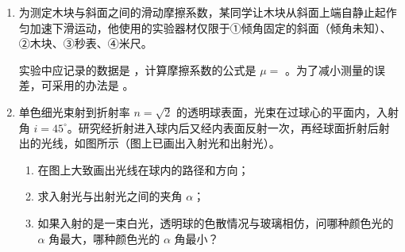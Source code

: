 \documentclass[\gkver]{gaokaozhenti}
\begin{document}
\begin{enumerate}
从纸带上可以确定小车作匀减速运动的初速度是  $\Ums$，小车在布上运动的加速度大小是  $\Umsq$。
\onepicture[align=right, w=12.00cm]{}


\item
为测定木块与斜面之间的滑动摩擦系数，某同学让木块从斜面上端自静止起作匀加速下滑运动，他使用的实验器材仅限于①倾角固定的斜面（倾角未知）、②木块、③秒表、④米尺。

实验中应记录的数据是 ，计算摩擦系数的公式是 $\mu =$ 。为了减小测量的误差，可采用的办法是 。
\onepicture[align=right, w=5.60cm]{}


\item
单色细光束射到折射率 $n = \sqrt{2}$ 的透明球表面，光束在过球心的平面内，入射角 $i = 45^{\circ}$。研究经折射进入球内后又经内表面反射一次，再经球面折射后射出的光线，如图所示（图上已画出入射光和出射光）。
\begin{enumerate}
	\item
	在图上大致画出光线在球内的路径和方向；
	\item
	求入射光与出射光之间的夹角 $\alpha$；
	\item
	如果入射的是一束白光，透明球的色散情况与玻璃相仿，问哪种颜色光的 $\alpha$ 角最大，哪种颜色光的 $\alpha$ 角最小？
\end{enumerate}
\onepicture[align=right, w=5.53cm]{}

\end{enumerate}
\end{document}
